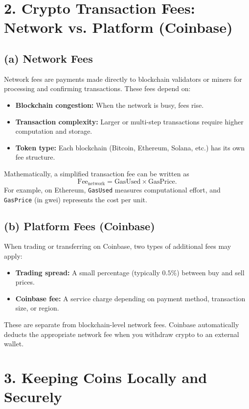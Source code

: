 \documentclass{article}
\begin{document}
\bigskip

\section*{2. Crypto Transaction Fees: Network vs. Platform (Coinbase)}

\subsection*{(a) Network Fees}
Network fees are payments made directly to blockchain validators or miners for processing and confirming transactions. These fees depend on:
\begin{itemize}
  \item \textbf{Blockchain congestion:} When the network is busy, fees rise.
  \item \textbf{Transaction complexity:} Larger or multi-step transactions require higher computation and storage.
  \item \textbf{Token type:} Each blockchain (Bitcoin, Ethereum, Solana, etc.) has its own fee structure.
\end{itemize}

Mathematically, a simplified transaction fee can be written as
\[
\text{Fee}_{\text{network}} = \text{GasUsed} \times \text{GasPrice}.
\]
For example, on Ethereum, \texttt{GasUsed} measures computational effort, and \texttt{GasPrice} (in gwei) represents the cost per unit.

\subsection*{(b) Platform Fees (Coinbase)}
When trading or transferring on Coinbase, two types of additional fees may apply:
\begin{itemize}
  \item \textbf{Trading spread:} A small percentage (typically $0.5\%$) between buy and sell prices.
  \item \textbf{Coinbase fee:} A service charge depending on payment method, transaction size, or region.
\end{itemize}
These are separate from blockchain-level network fees.  
Coinbase automatically deducts the appropriate network fee when you withdraw crypto to an external wallet.

\bigskip

\section*{3. Keeping Coins Locally and Securely}
\end{document}
